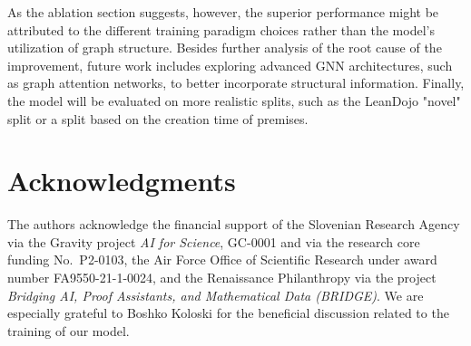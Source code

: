 As the ablation section suggests, however, the superior performance might be attributed to the different training paradigm choices rather than the model’s utilization of graph structure. Besides further analysis of the root cause of the improvement, future work includes exploring advanced GNN architectures, such as graph attention networks, to better incorporate structural information. Finally, the model will be evaluated on more realistic splits, such as the LeanDojo "novel" split or a split based on the creation time of premises.


\section{Acknowledgments}

The authors acknowledge the financial support of the Slovenian Research Agency via the Gravity project \textsl{AI for Science}, GC-0001 and via the research core funding No.~P2-0103, the Air Force Office of Scientific Research under award number FA9550-21-1-0024, and the Renaissance Philanthropy via the project \textsl{Bridging AI, Proof Assistants, and Mathematical Data (BRIDGE)}. We are especially grateful to Boshko Koloski for the beneficial discussion related to the training of our model.


